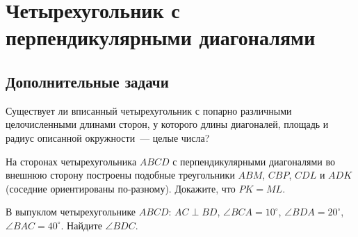 
\section*{Четырехугольник с перпендикулярными диагоналями}

\subsection*{Дополнительные задачи}


\begin{problems}

\item
Существует ли вписанный четырехугольник с попарно различными целочисленными
длинами сторон, у которого длины диагоналей, площадь и радиус описанной
окружности~--- целые числа?

\item
На сторонах четырехугольника $ABCD$ с перпендикулярными диагоналями во внешнюю
сторону построены подобные треугольники $ABM$, $CBP$, $CDL$ и $ADK$
(соседние ориентированы по-разному).
Докажите, что $PK = ML$.

\item
В выпуклом четырехугольнике $ABCD$:
$AC \perp BD$,
$\angle BCA = 10^\circ$, $\angle BDA = 20^\circ$, $\angle BAC = 40^\circ$.
Найдите $\angle BDC$.

\end{problems}

